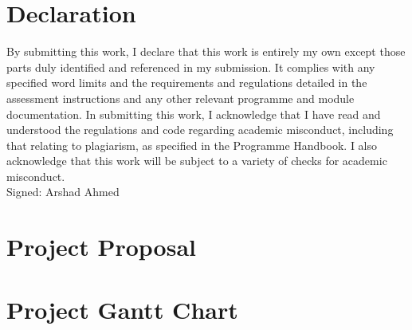 \documentclass[12pt, oneside]{report}
\date{}
\begin{document}


\maketitle{}

\chapter*{Declaration}

By submitting this work, I declare that this work is entirely my own except those parts duly identified and referenced in my submission. It complies with any specified word limits and the requirements and regulations detailed in the assessment instructions and any other relevant programme and module documentation. In submitting this work, I acknowledge that I have read and understood the regulations and code regarding academic misconduct, including that relating to plagiarism, as specified in the Programme Handbook. I also acknowledge that this work will be subject to a variety of checks for academic misconduct.  \\


Signed: Arshad Ahmed



\tableofcontents

\listoffigures














\clearpage%
\printbibliography

\appendix

\chapter{Project Proposal}


\chapter{Project Gantt Chart}

\end{document}
